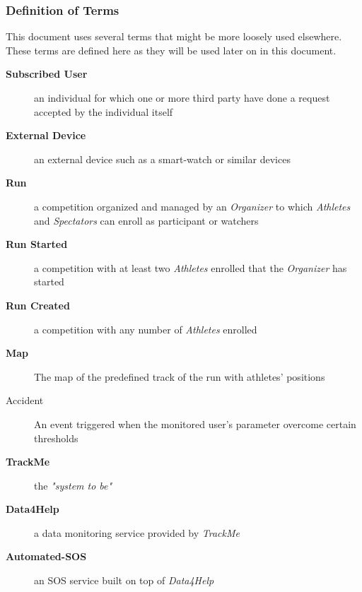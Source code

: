 \documentclass[a4paper]{article}
\begin{document}
            \subsubsection{Definition of Terms}
            This document uses several terms that might be more loosely used elsewhere. These terms are defined here as they will be used later on in this document.
                \begin{description}
                    \item[\textbf{Subscribed User}] an individual for which one or more third party have done a request accepted by the individual itself
                    
                    \item[\textbf{External Device}] an external device such as a smart-watch or similar devices
                    
                    \item[\textbf{Run}] a competition organized and managed by an \textit{Organizer} to which \textit{Athletes} and \textit{Spectators} can enroll as participant or watchers
                    
                    \item[\textbf{Run Started}] a competition with at least two \textit{Athletes} enrolled that the \textit{Organizer} has started
                    
                    \item[\textbf{Run Created}] a competition with any number of \textit{Athletes} enrolled
                    
                    \item[\textbf{Map}] The map of the predefined track of the run with athletes' positions
                    
                    \item[Accident] An event triggered when the monitored user's parameter overcome certain thresholds
                    
                    \item[\textbf{TrackMe}] the \textit{"system to be"}
                    
                    \item[\textbf{Data4Help}] a data monitoring service provided by \textit{TrackMe}
                    
                    \item[\textbf{Automated-SOS}] an SOS service built on top of \textit{Data4Help}
                    

\end{description}
\end{document}

